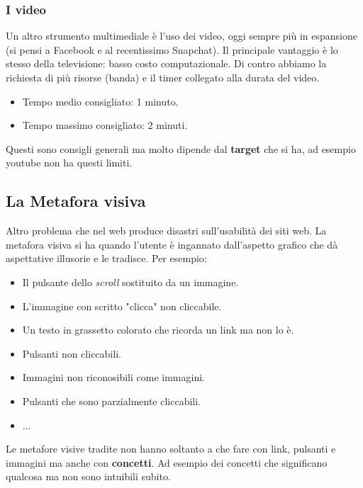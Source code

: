 			\subsubsection{I video}
				Un altro strumento multimediale è l'uso dei video, oggi sempre più in espansione (si pensi a Facebook e al recentissimo Snapchat). Il principale vantaggio è lo stesso della televisione: basso costo computazionale. Di contro abbiamo la richiesta di più risorse (banda) e il timer collegato alla durata del video. 
				\begin{itemize}
					\item Tempo medio consigliato: 1 minuto.
					\item Tempo massimo consigliato: 2 minuti.
				\end{itemize}
				Questi sono consigli generali ma molto dipende dal \textbf{target} che si ha, ad esempio youtube non ha questi limiti.
		
		\subsection{La Metafora visiva}
			Altro problema che nel web produce disastri sull'usabilità dei siti web. La metafora visiva si ha quando l'utente è ingannato dall'aspetto grafico che dà aspettative illusorie e le tradisce. Per esempio:
			\begin{itemize}
				\item Il pulsante dello \emph{scroll} sostituito da un immagine.
				\item L'immagine con scritto "clicca" non cliccabile.
				\item Un testo in grassetto colorato che ricorda un link ma non lo è.
				\item Pulsanti non cliccabili.
				\item Immagini non riconosibili come immagini.
				\item Pulsanti che sono parzialmente cliccabili.
				\item ...
			\end{itemize}
			Le metafore visive tradite non hanno soltanto a che fare con link, pulsanti e immagini ma anche con \textbf{concetti}. Ad esempio dei concetti che significano qualcosa ma non sono intuibili subito.
		
